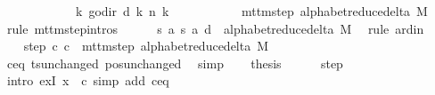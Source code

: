 \begin{isabellebody}
\ \ \ \ \ \ \ \ \ \ \ \ {\isacharparenleft}{\kern0pt}{\isasymlambda}k{\isachardot}{\kern0pt}\ go{\isacharunderscore}{\kern0pt}dir\ {\isacharparenleft}{\kern0pt}{\isacharquery}{\kern0pt}d\ k{\isacharparenright}{\kern0pt}\ {\isacharparenleft}{\kern0pt}n\ k{\isacharparenright}{\kern0pt}{\isacharparenright}{\kern0pt}{\isacharparenright}{\kern0pt}\isanewline
\ \ \ \ \ \ \ \ \ \ {\isasymin}\ mttm{\isacharunderscore}{\kern0pt}step\ {\isacharparenleft}{\kern0pt}alphabet{\isacharunderscore}{\kern0pt}reduce{\isacharunderscore}{\kern0pt}delta\ M{\isacharparenright}{\kern0pt}{\isachardoublequoteclose}\isanewline
\ \ \isamarkupfalse%
\ {\isacharparenleft}{\kern0pt}rule\ mttm{\isacharunderscore}{\kern0pt}step{\isachardot}{\kern0pt}intros{\isacharparenright}{\kern0pt}\isanewline
\ \ \ \ \isamarkupfalse%
\ {\isachardoublequoteopen}{\isacharparenleft}{\kern0pt}{\isacharquery}{\kern0pt}s{\isacharcomma}{\kern0pt}\ {\isacharquery}{\kern0pt}a{\isacharcomma}{\kern0pt}\ {\isacharquery}{\kern0pt}s{\isacharprime}{\kern0pt}{\isacharcomma}{\kern0pt}\ {\isacharquery}{\kern0pt}a{\isacharcomma}{\kern0pt}\ {\isacharquery}{\kern0pt}d{\isacharparenright}{\kern0pt}\ {\isasymin}\ alphabet{\isacharunderscore}{\kern0pt}reduce{\isacharunderscore}{\kern0pt}delta\ M{\isachardoublequoteclose}\ \isamarkupfalse%
\ {\isacharparenleft}{\kern0pt}rule\ ard{\isacharunderscore}{\kern0pt}in{\isacharparenright}{\kern0pt}\isanewline
\ \ \isamarkupfalse%
\isanewline
\ \ \isamarkupfalse%
\ step{\isacharcolon}{\kern0pt}\ {\isachardoublequoteopen}{\isacharparenleft}{\kern0pt}c{\isacharprime}{\kern0pt}{\isacharcomma}{\kern0pt}\ {\isacharquery}{\kern0pt}c{\isacharprime}{\kern0pt}{\isacharprime}{\kern0pt}{\isacharparenright}{\kern0pt}\ {\isasymin}\ mttm{\isacharunderscore}{\kern0pt}step\ {\isacharparenleft}{\kern0pt}alphabet{\isacharunderscore}{\kern0pt}reduce{\isacharunderscore}{\kern0pt}delta\ M{\isacharparenright}{\kern0pt}{\isachardoublequoteclose}\isanewline
\ \ \ \ \isamarkupfalse%
\ c{\isacharprime}{\kern0pt}{\isacharunderscore}{\kern0pt}eq\ ts{\isacharunderscore}{\kern0pt}unchanged\ pos{\isacharunderscore}{\kern0pt}unchanged\ \isamarkupfalse%
\ simp\isanewline
\ \ \isamarkupfalse%
\ {\isacharquery}{\kern0pt}thesis\isanewline
\ \ \ \ \isamarkupfalse%
\ step\ \isamarkupfalse%
\ {\isacharparenleft}{\kern0pt}intro\ exI{\isacharbrackleft}{\kern0pt}\ x\ {\isacharequal}{\kern0pt}\ {\isacharquery}{\kern0pt}c{\isacharprime}{\kern0pt}{\isacharprime}{\kern0pt}{\isacharbrackright}{\kern0pt}{\isacharparenright}{\kern0pt}\ {\isacharparenleft}{\kern0pt}simp\ add{\isacharcolon}{\kern0pt}\ c{\isacharprime}{\kern0pt}{\isacharunderscore}{\kern0pt}eq{\isacharparenright}{\kern0pt}\isanewline

\end{isabellebody}
